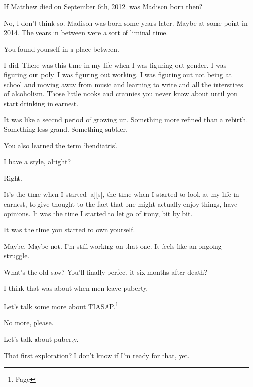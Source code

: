 \label{liminal}
\begin{paracol}{2}
  \begin{leftcolumn}

\begin{ally}
If Matthew died on September 6th, 2012, was Madison born then?
\end{ally}
No, I don't think so. Madison was born some years later. Maybe at some point in 2014. The years in between were a sort of liminal time.

\begin{ally}
You found yourself in a place between.
\end{ally}
I did. There was this time in my life when I was figuring out gender. I was figuring out poly. I was figuring out working. I was figuring out not being at school and moving away from music and learning to write and all the interstices of alcoholism. Those little nooks and crannies you never know about until you start drinking in earnest.

It was like a second period of growing up. Something more refined than a rebirth. Something less grand. Something subtler.

\begin{ally}
You also learned the term `hendiatris'.
\end{ally}
I have a style, alright?

\begin{ally}
Right.
\end{ally}
It's the time when I started {[}a{]}{[}s{]}, the time when I started to look at my life in earnest, to give thought to the fact that one might actually enjoy things, have opinions. It was the time I started to let go of irony, bit by bit.

\begin{ally}
It was the time you started to own yourself.
\end{ally}
Maybe. Maybe not. I'm still working on that one. It feels like an ongoing struggle.

\begin{ally}
What's the old saw? You'll finally perfect it six months after death?
\end{ally}
I think that was about when men leave puberty.

\begin{ally}
Let's talk some more about TIASAP.\footnote{Page \pageref{furry:younes}}
\end{ally}
No more, please.

\begin{ally}
Let's talk about puberty.
\end{ally}
That first exploration? I don't know if I'm ready for that, yet.


\end{leftcolumn}
\end{paracol}
